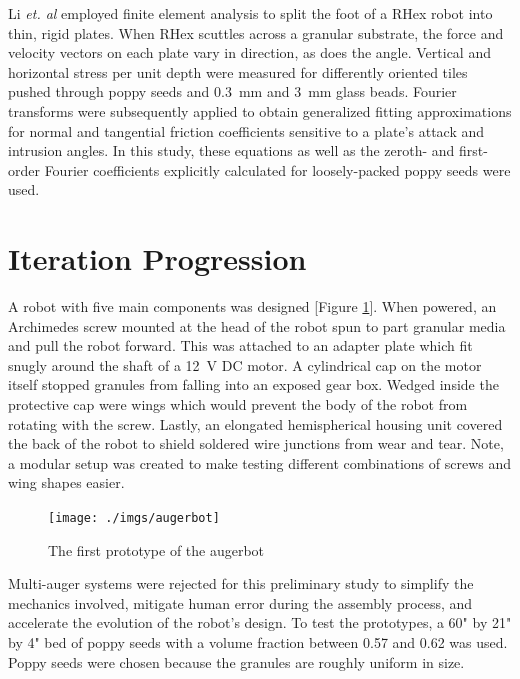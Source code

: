 \documentclass[letterpaper, 11 pt]{article}
\begin{document}
Li \textit{et. al} employed finite element analysis to split the foot of a RHex robot into thin, rigid plates. When RHex scuttles across a granular substrate, the force and velocity vectors on each plate vary in direction, as does the angle. 
Vertical and horizontal stress per unit depth were measured for differently oriented tiles pushed through poppy seeds and \SI{0.3}{\milli\m} and \SI{3}{\milli\m} glass beads. 
Fourier transforms were subsequently applied to obtain generalized fitting approximations for normal and tangential friction coefficients sensitive to a plate's attack and intrusion angles. In this study, these equations as well as the zeroth- and first-order Fourier coefficients explicitly calculated for loosely-packed poppy seeds were used. 

\section{Iteration Progression}

A robot with five main components was designed [Figure \ref{fig:augerbot}]. When powered, an Archimedes screw mounted at the head of the robot spun to part granular media and pull the robot forward. This was attached to an adapter plate which fit snugly around the shaft of a \SI{12}{\V} DC motor. A cylindrical cap on the motor itself stopped granules from falling into an exposed gear box. Wedged inside the protective cap were wings which would prevent the body of the robot from rotating with the screw. Lastly, an elongated hemispherical housing unit covered the back of the robot to shield soldered wire junctions from wear and tear. Note, a modular setup was created to make testing different combinations of screws and wing shapes easier. 

\begin{figure}[H]
\centering
\texttt{[image: ./imgs/augerbot]}
\caption{The first prototype of the augerbot}
\label{fig:augerbot}
\end{figure}

Multi-auger systems were rejected for this preliminary study to simplify the mechanics involved, mitigate human error during the assembly process, and accelerate the evolution of the robot's design. To test the prototypes, a 60" by 21" by 4" bed of poppy seeds with a volume fraction between 0.57 and 0.62 was used. Poppy seeds were chosen because the granules are roughly uniform in size.
\end{document}
